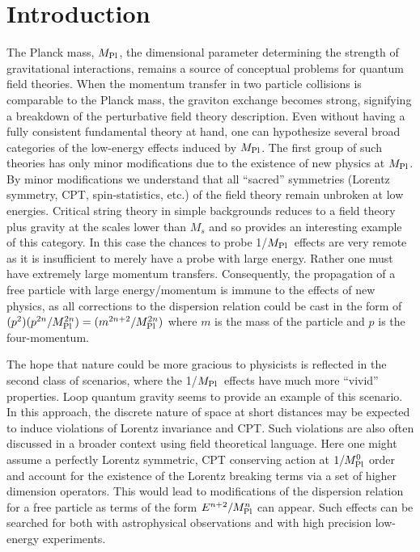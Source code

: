 \documentclass[12pt]{article}
\newcommand{\Mpl}{$M_{\rm {\small Pl}}$}
\newcommand{\mpl}{M_{\rm {\small Pl}}}
\begin{document}
\vfill \setcounter{page}{0} \setcounter{footnote}{0}
\newpage


\section{Introduction}

The Planck mass, \Mpl, the dimensional parameter determining the
strength of gravitational interactions, remains a source of
conceptual problems for quantum field theories. When the momentum
transfer in two particle collisions is comparable to the Planck
mass, the graviton exchange becomes strong, signifying a breakdown
of the perturbative field theory description. Even without having
a fully consistent fundamental theory at hand, one can hypothesize
several broad categories of the low-energy effects induced by
\Mpl. The first group of such theories has only minor
modifications due to the existence of new physics at \Mpl. By
minor modifications we understand that all ``sacred'' symmetries
(Lorentz symmetry, CPT, spin-statistics, etc.) of the field theory
remain unbroken at low energies. Critical string theory in simple
backgrounds reduces to a field theory plus gravity at the scales
lower than $M_{s}$ and so provides an interesting example of this
category. In this case the chances to probe 1/\Mpl\ effects are
very remote as it is insufficient to merely have a probe with
large energy. Rather one must have extremely large momentum
transfers. Consequently, the propagation of a free particle with
large energy/momentum is immune to the effects of new physics, as
all corrections to the dispersion relation could be cast in the
form of $(p^2)(p^{2n}/M_{\rm Pl}^{2n})= (m^{2n+2}/M_{\rm
Pl}^{2n})$ where $m$ is the mass of the particle and $p$ is the
four-momentum.

The hope that nature could be more gracious to physicists is
reflected in the second class of scenarios, where the 1/\Mpl\
effects have much more ``vivid'' properties. Loop quantum gravity
seems to provide an example of this scenario. In this approach,
the discrete nature of space at short distances may be expected to
induce violations of Lorentz invariance and CPT. Such violations
are also often discussed in a broader context using field
theoretical language\cite{Kost}. Here one might assume a perfectly
Lorentz symmetric, CPT conserving action at $1/M_{\rm Pl}^{0}$
order and account for the existence of the Lorentz breaking terms
via a set of higher dimension operators. This would lead to
modifications of the dispersion relation for a free particle as
terms of the form $E^{n+2}/\mpl^{n}$ can appear. Such effects can
be searched for both with astrophysical
observations\cite{mass,rot,Jacob,wow,wow2} and with high precision
low-energy experiments\cite{terra,Vuc,prl}.
\end{document}

